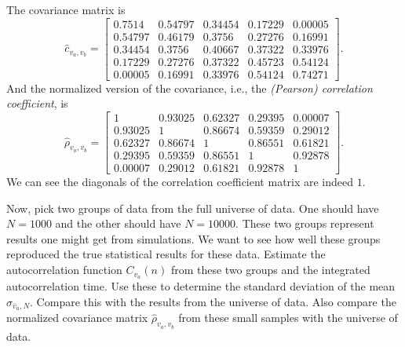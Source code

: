 \Answer{}
The covariance matrix is
%
\begin{equation}
    \hat{c}_{v_a, v_b} =
    \begin{bmatrix}
        0.7514  & 0.54797 & 0.34454 & 0.17229 & 0.00005 \\
        0.54797 & 0.46179 & 0.3756  & 0.27276 & 0.16991 \\
        0.34454 & 0.3756  & 0.40667 & 0.37322 & 0.33976 \\
        0.17229 & 0.27276 & 0.37322 & 0.45723 & 0.54124 \\
        0.00005 & 0.16991 & 0.33976 & 0.54124 & 0.74271
    \end{bmatrix}.
\end{equation}
%
And the normalized version of the covariance, i.e., the
\emph{(Pearson) correlation coefficient}, is
%
\begin{equation}
    \hat{\rho}_{v_a, v_b} =
    \begin{bmatrix}
        1       & 0.93025 & 0.62327 & 0.29395 & 0.00007 \\
        0.93025 & 1       & 0.86674 & 0.59359 & 0.29012 \\
        0.62327 & 0.86674 & 1       & 0.86551 & 0.61821 \\
        0.29395 & 0.59359 & 0.86551 & 1       & 0.92878 \\
        0.00007 & 0.29012 & 0.61821 & 0.92878 & 1
    \end{bmatrix}.
\end{equation}
%
We can see the diagonals of the correlation coefficient matrix are indeed \(1\).


\Question{} Now, pick two groups of data from the full universe of data. One should have
\(N = 1000\) and the other should have \(N = 10000\). These two groups represent results one
might get from simulations. We want to see how well these groups reproduced the true
statistical results for these data.
Estimate the autocorrelation function \(C_{v_a}(n)\) from these two groups and the integrated
autocorrelation time. Use these to determine the standard deviation of the mean
\(\sigma_{\bar{v}_a,N}\). Compare this with the results from the universe of data. Also
compare the normalized covariance matrix \(\hat{\rho}_{v_a, v_b}\) from these small samples
with the universe of data.

